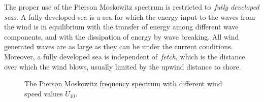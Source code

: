The proper use of the Pierson Moskowitz spectrum is restricted to~\emph{fully
developed seas}. A fully developed sea is a sea for which the energy input
to the waves from the wind is in equilibrium with the transfer of energy
among different wave components, and with the dissipation of energy by wave 
breaking. All wind generated waves are as large as they can be under the 
current conditions. Moreover, a fully developed sea is independent 
of~\emph{fetch}, which is the distance over which the wind blows, usually
limited by the upwind distance to shore.
%
%
\begin{figure}
\centering
{}
\caption{The Pierson Moskowitz frequency spectrum with different wind speed 
values $U_{10}$.}
\label{fig:pm_spectra}
\end{figure}
%
